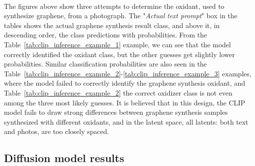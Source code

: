 \documentclass[runningheads]{llncs}
\begin{document}
\vspace{0.5cm} \\
The figures above show three attempts to determine the oxidant, used to synthesize graphene, from a photograph. The "\textit{Actual text prompt}" box in the tables shows the actual graphene synthesis result class, and above it, in descending order, the class predictions with probabilities. From the Table~\ref{tab:clip_inference_example_1} example, we can see that the model correctly identified the oxidant class, but the other guesses get slightly lower probabilities. Similar classification probabilities are also seen in the Table~\ref{tab:clip_inference_example_2}-\ref{tab:clip_inference_example_3} examples, where the model failed to correctly identify the graphene synthesis oxidant, and Table~\ref{tab:clip_inference_example_2} the correct oxidizer class is not even among the three most likely guesses. It is believed that in this design, the CLIP model fails to draw strong differences between graphene synthesis samples synthesized with different oxidants, and in the latent space, all latents: both text and photos, are too closely spaced.

\subsection{Diffusion model results}
\end{document}
